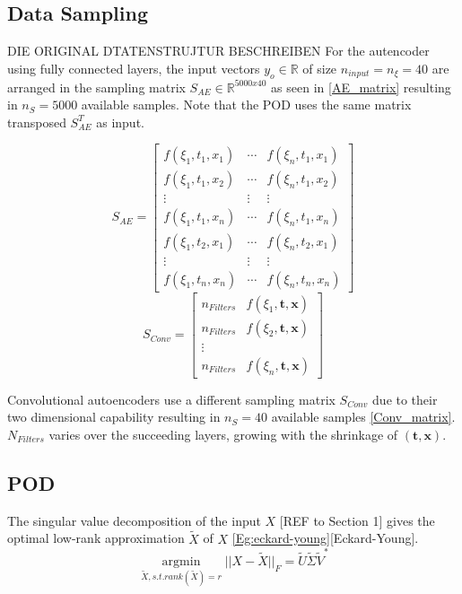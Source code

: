 \documentclass[12pt, a4paper]{article}
\begin{document}
\subsection{Data Sampling}
DIE ORIGINAL DTATENSTRUJTUR BESCHREIBEN
For the autencoder using fully connected layers, the input vectors $y_o \in \mathbb{R}$ of size $n_{input} = n_{\xi} = 40$ are arranged in the sampling matrix $S_{AE} \in \mathbb{R}^{5000x40}$ as seen in \cref{AE_matrix} resulting in $n_S = 5000$ available samples. Note that the POD uses the same matrix transposed $S_{AE}^T$ as input.
\begin{multicols}{2}
	\begin{equation}
	S_{AE} = \begin{bmatrix}
	f(\xi_1,t_1,x_1)&\cdots &f(\xi_n,t_1,x_1) \\
	f(\xi_1,t_1,x_2)&\cdots &f(\xi_n,t_1,x_2) \\
	\vdots& \vdots & \vdots\\
	f(\xi_1,t_1,x_n)&\cdots &f(\xi_n,t_1,x_n)\\
	f(\xi_1,t_2,x_1)&\cdots &f(\xi_n,t_2,x_1)\\
	\vdots & \vdots & \vdots\\
	f(\xi_1,t_n,x_n)&\cdots &f(\xi_n,t_n,x_n)
	\end{bmatrix}
	\label{AE_matrix}
	\end{equation}\break
	\begin{equation}
	S_{Conv}= \begin{bmatrix}
	n_{Filters}&f(\xi_1,\textbf{t},\textbf{x})\\
	n_{Filters}&f(\xi_2,\textbf{t},\textbf{x})\\
	\vdots\\
	n_{Filters}&f(\xi_n,\textbf{t},\textbf{x})
	\end{bmatrix}
	\label{Conv_matrix}
	\end{equation}
\end{multicols}\noindent
Convolutional autoencoders use a different sampling matrix $S_{Conv}$ due to their two dimensional capability resulting in $n_S = 40$ available samples \cref{Conv_matrix}.$N_{Filters}$ varies over the succeeding layers, growing with the shrinkage of $(\textbf{t},\textbf{x})$.
\subsection{POD}
The singular value decomposition of the input $X$ [REF to Section 1] gives the optimal low-rank approximation $\tilde{X}$ of $X$ \cref{Eg:eckard-young}[Eckard-Young]. 
\begin{equation}
\underset{\tilde{X}, s.t. rank(\tilde{X})=r}{\operatorname{argmin}} || X -\tilde{X} ||_F=\tilde{U}\tilde{\Sigma}\tilde{V}^*
\label{Eg:eckard-young}
\end{equation}
\end{document}
